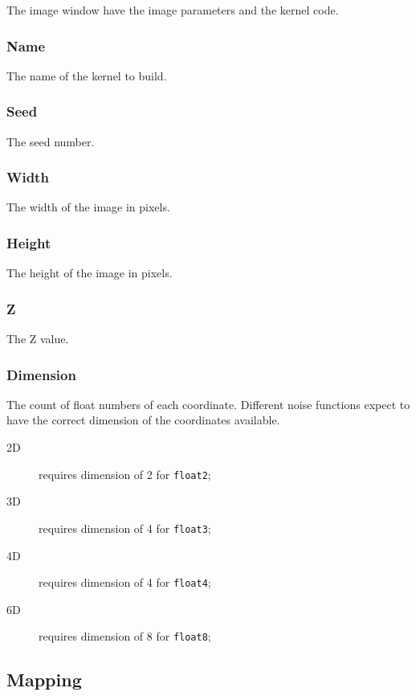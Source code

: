 The image window have the image parameters and the kernel code.

\subsubsection{Name}

The name of the kernel to build.

\subsubsection{Seed}

The seed number.

\subsubsection{Width}

The width of the image in pixels.

\subsubsection{Height}

The height of the image in pixels.

\subsubsection{Z}

The Z value.

\subsubsection{Dimension}

The count of float numbers of each coordinate. Different noise functions
expect to have the correct dimension of the coordinates available.

\begin{description}
\item[2D] requires dimension of 2 for \texttt{float2};
\item[3D] requires dimension of 4 for \texttt{float3};
\item[4D] requires dimension of 4 for \texttt{float4};
\item[6D] requires dimension of 8 for \texttt{float8};
\end{description}

\label{sec:mapping}\subsection{Mapping}

